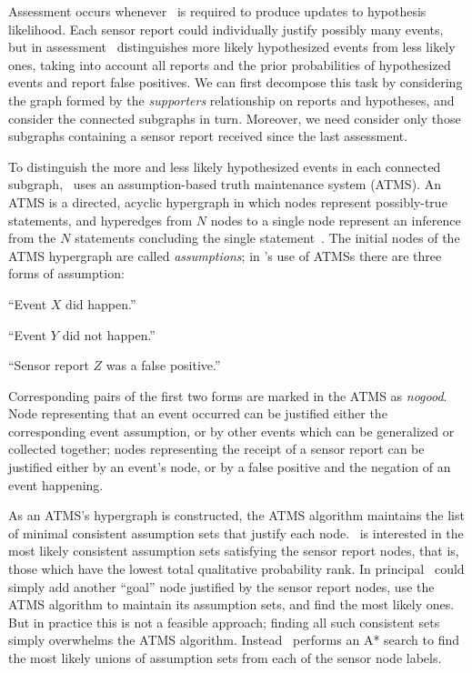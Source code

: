 {Assessment occurs whenever \mifd\ is required to produce updates to
hypothesis likelihood. Each sensor report could individually justify
possibly many events, but in assessment \mifd\ distinguishes more
likely hypothesized events from less likely ones, taking into account
all reports and the prior probabilities of hypothesized events and
report false positives.  We can first decompose this task by
considering the graph formed by the \emph{supporters} relationship on
reports and hypotheses, and consider the connected subgraphs in
turn. Moreover, we need consider only those subgraphs containing a
sensor report received since the last assessment.

To distinguish the more and less likely hypothesized events in each
connected subgraph, \mifd\ uses an assumption-based truth maintenance
system (ATMS). An ATMS is a directed, acyclic hypergraph in which
nodes represent possibly-true statements, and hyperedges from $N$
nodes to a single node represent an inference from the $N$ statements
concluding the single statement~\cite{Forbus+DeKleer:1993}. The
initial nodes of the ATMS hypergraph are called \emph{assumptions}; in
\mifd's use of ATMSs there are three forms of assumption:
\begin{compactitem}
\item ``Event $X$ did happen.''
\item ``Event $Y$ did not happen.''
\item ``Sensor report $Z$ was a false positive.''
\end{compactitem}
Corresponding pairs of the first two forms are marked in the ATMS as
\emph{nogood}.  Node representing that an event occurred can be
justified either the corresponding event assumption, or by other
events which can be generalized or collected together; nodes
representing the receipt of a sensor report can be justified either by
an event's node, or by a false positive and the negation of an event
happening.

As an ATMS's hypergraph is constructed, the ATMS algorithm maintains
the list of minimal consistent assumption sets that justify each node.
\mifd\ is interested in the most likely consistent assumption sets
satisfying the sensor report nodes, that is, those which have the
lowest total qualitative probability rank.  In principal \mifd\ could
simply add another ``goal'' node justified by the sensor report nodes,
use the ATMS algorithm to maintain its assumption sets, and find the
most likely ones. But in practice this is not a feasible approach;
finding all such consistent sets simply overwhelms the ATMS algorithm.
Instead \mifd\ performs an A* search to find the most likely unions of
assumption sets from each of the sensor node labels.

}
